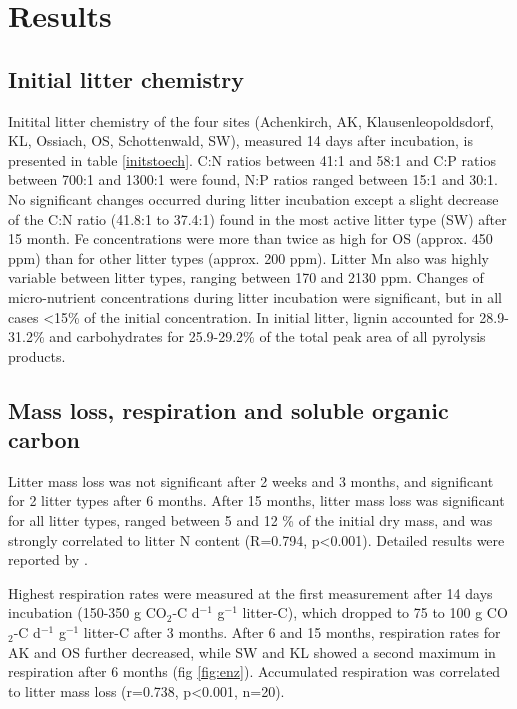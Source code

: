 \section*{Results}
\subsection*{Initial litter chemistry}
Initital litter chemistry of the four sites (Achenkirch, AK, Klausenleopoldsdorf, KL, Ossiach, OS, Schottenwald, SW), measured 14 days after incubation, is presented in table \ref{initstoech}. C:N ratios between 41:1 and 58:1 and C:P ratios between 700:1 and 1300:1 were found, N:P ratios ranged between 15:1 and 30:1. No significant changes occurred during litter incubation except a slight decrease of the C:N ratio (41.8:1 to 37.4:1) found in the most active litter type (SW) after 15 month. Fe concentrations were more than twice as high for OS (approx. 450 ppm) than for other litter types (approx. 200 ppm). Litter Mn also was highly variable between litter types, ranging between 170 and 2130 ppm. Changes of micro-nutrient concentrations during litter incubation were significant, but in all cases \textless 15\% of the initial concentration. In initial litter, lignin accounted for 28.9-31.2\% and carbohydrates for 25.9-29.2\% of the total peak area of all pyrolysis products.

\subsection*{Mass loss, respiration and soluble organic carbon}

Litter mass loss was not significant after 2 weeks and 3 months, and significant for 2 litter types after 6 months. After 15 months, litter mass loss was significant for all litter types, ranged between 5 and 12 \% of the initial dry mass, and was strongly correlated to litter N content (R=0.794, p\textless 0.001). Detailed results were reported by \cite{Mooshammer2011}.

Highest respiration rates were measured at the first measurement after 14 days incubation (150-350 \textmu g CO$_2$-C d$^{-1}$ g$^{-1}$ litter-C), which dropped to 75 to 100 \textmu g CO$_2$-C d$^{-1}$ g$^{-1}$ litter-C after 3 months. After 6 and 15 months, respiration rates for AK and OS further decreased, while SW and KL showed a second maximum in respiration after 6 months (fig \ref{fig:enz}). Accumulated respiration was correlated to litter mass loss (r=0.738, p\textless 0.001, n=20).%

